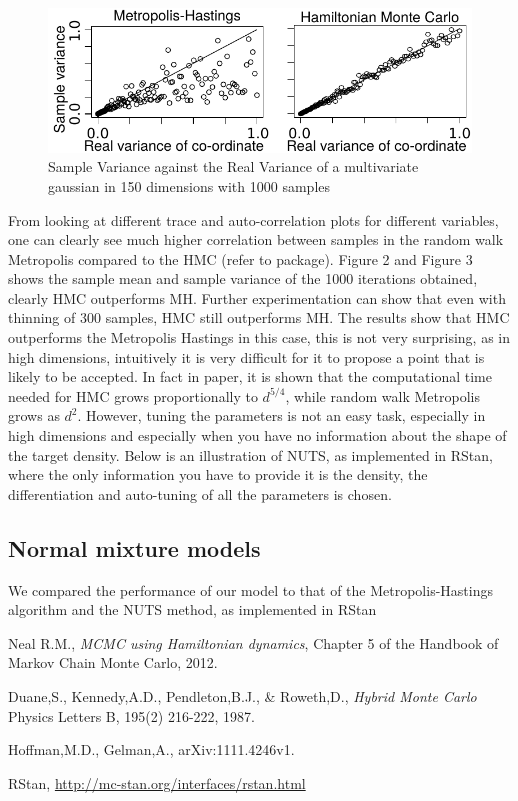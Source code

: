 \documentclass[11pt]{article}
\begin{document}
\begin{figure}[H]
\center
  \includegraphics[width=5in]{images/MHvsHM_varcoord.pdf}
  \caption{Sample Variance against the Real Variance of a multivariate gaussian in 150 dimensions with 1000 samples}
\end{figure}
From looking at different trace and auto-correlation plots for different variables, one can clearly see much higher correlation between samples in the random walk Metropolis compared to the HMC (refer to package). Figure 2 and Figure 3 shows the sample mean and sample variance of the 1000 iterations obtained, clearly HMC outperforms MH. Further experimentation can show that even with thinning of 300 samples, HMC still outperforms MH. The results show that HMC outperforms the Metropolis Hastings in this case, this is not very surprising, as in high dimensions, intuitively it is very difficult for it to propose a point that is likely to be accepted. In fact in paper, it is shown that the computational time needed for HMC grows proportionally to $d^{5/4}$, while random walk Metropolis grows as $d^{2}$. However, tuning the parameters is not an easy task, especially in high dimensions and especially when you have no information about the shape of the target density. Below is an illustration of NUTS, as implemented in RStan, where the only information you have to provide it is the density, the differentiation and auto-tuning of all the parameters is chosen. 

\cite{rstan}
\subsection{Normal mixture models}
We compared the performance of our model to that of the Metropolis-Hastings algorithm and the NUTS method, as implemented in RStan

\begin{thebibliography}{9}

  Neal R.M.,
  \emph{MCMC using Hamiltonian dynamics},
  Chapter 5 of the Handbook of Markov Chain Monte Carlo,
  2012.
  
  Duane,S., Kennedy,A.D., Pendleton,B.J., \& Roweth,D.,
  \emph{Hybrid Monte Carlo }
  Physics Letters B, 195(2) 216-222, 1987.

  Hoffman,M.D., Gelman,A.,
  arXiv:1111.4246v1.
  
  RStan, \url{http://mc-stan.org/interfaces/rstan.html}

\end{thebibliography}
\end{document}
